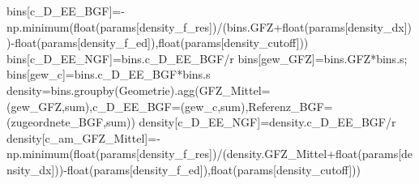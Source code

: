 \documentclass[
  ngerman,
  a4paper,
  DIV=11]{scrreprt}
\newenvironment{Shaded}{\begin{snugshade}}{\end{snugshade}}
\newcommand{\BuiltInTok}[1]{\textcolor[rgb]{0.00,0.23,0.31}{#1}}
\newcommand{\NormalTok}[1]{\textcolor[rgb]{0.00,0.23,0.31}{#1}}
\newcommand{\OperatorTok}[1]{\textcolor[rgb]{0.37,0.37,0.37}{#1}}
\newcommand{\StringTok}[1]{\textcolor[rgb]{0.13,0.47,0.30}{#1}}
\begin{document}
\begin{Shaded}
\begin{Highlighting}[]
\NormalTok{bins[}\StringTok{\textquotesingle{}c\_D\_EE\_BGF\textquotesingle{}}\NormalTok{]}\OperatorTok{={-}}\NormalTok{np.minimum(}\BuiltInTok{float}\NormalTok{(params[}\StringTok{\textquotesingle{}density\_f\_res\textquotesingle{}}\NormalTok{])}\OperatorTok{/}\NormalTok{(bins.GFZ}\OperatorTok{+}\BuiltInTok{float}\NormalTok{(params[}\StringTok{\textquotesingle{}density\_dx\textquotesingle{}}\NormalTok{]))}\OperatorTok{{-}}\BuiltInTok{float}\NormalTok{(params[}\StringTok{\textquotesingle{}density\_f\_ed\textquotesingle{}}\NormalTok{]),}\BuiltInTok{float}\NormalTok{(params[}\StringTok{\textquotesingle{}density\_cutoff\textquotesingle{}}\NormalTok{]))}
\NormalTok{bins[}\StringTok{\textquotesingle{}c\_D\_EE\_NGF\textquotesingle{}}\NormalTok{]}\OperatorTok{=}\NormalTok{bins.c\_D\_EE\_BGF}\OperatorTok{/}\NormalTok{r}
\NormalTok{bins[}\StringTok{\textquotesingle{}gew\_GFZ\textquotesingle{}}\NormalTok{]}\OperatorTok{=}\NormalTok{bins.GFZ}\OperatorTok{*}\NormalTok{bins.s}\OperatorTok{;}\NormalTok{ bins[}\StringTok{\textquotesingle{}gew\_c\textquotesingle{}}\NormalTok{]}\OperatorTok{=}\NormalTok{bins.c\_D\_EE\_BGF}\OperatorTok{*}\NormalTok{bins.s}
\NormalTok{density}\OperatorTok{=}\NormalTok{bins.groupby(}\StringTok{\textquotesingle{}Geometrie\textquotesingle{}}\NormalTok{).agg(GFZ\_Mittel}\OperatorTok{=}\NormalTok{(}\StringTok{\textquotesingle{}gew\_GFZ\textquotesingle{}}\NormalTok{,}\StringTok{\textquotesingle{}sum\textquotesingle{}}\NormalTok{),c\_D\_EE\_BGF}\OperatorTok{=}\NormalTok{(}\StringTok{\textquotesingle{}gew\_c\textquotesingle{}}\NormalTok{,}\StringTok{\textquotesingle{}sum\textquotesingle{}}\NormalTok{),Referenz\_BGF}\OperatorTok{=}\NormalTok{(}\StringTok{\textquotesingle{}zugeordnete\_BGF\textquotesingle{}}\NormalTok{,}\StringTok{\textquotesingle{}sum\textquotesingle{}}\NormalTok{))}
\NormalTok{density[}\StringTok{\textquotesingle{}c\_D\_EE\_NGF\textquotesingle{}}\NormalTok{]}\OperatorTok{=}\NormalTok{density.c\_D\_EE\_BGF}\OperatorTok{/}\NormalTok{r}
\NormalTok{density[}\StringTok{\textquotesingle{}c\_am\_GFZ\_Mittel\textquotesingle{}}\NormalTok{]}\OperatorTok{={-}}\NormalTok{np.minimum(}\BuiltInTok{float}\NormalTok{(params[}\StringTok{\textquotesingle{}density\_f\_res\textquotesingle{}}\NormalTok{])}\OperatorTok{/}\NormalTok{(density.GFZ\_Mittel}\OperatorTok{+}\BuiltInTok{float}\NormalTok{(params[}\StringTok{\textquotesingle{}density\_dx\textquotesingle{}}\NormalTok{]))}\OperatorTok{{-}}\BuiltInTok{float}\NormalTok{(params[}\StringTok{\textquotesingle{}density\_f\_ed\textquotesingle{}}\NormalTok{]),}\BuiltInTok{float}\NormalTok{(params[}\StringTok{\textquotesingle{}density\_cutoff\textquotesingle{}}\NormalTok{]))}

\end{Highlighting}
\end{Shaded}
\end{document}
